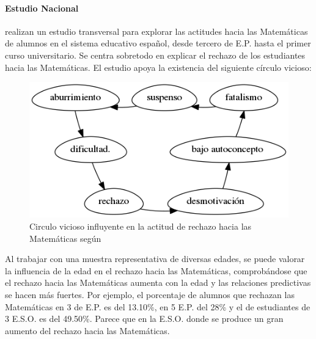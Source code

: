 \paragraph{Estudio Nacional}

\citet*{ActitudesHaciaMates} realizan un estudio transversal para explorar las actitudes hacia las Matemáticas de alumnos en el sistema educativo español, desde tercero de E.P. hasta el primer curso universitario. 
%
Se centra sobretodo en explicar el rechazo de los estudiantes hacia las Matemáticas.
%
El estudio apoya la existencia del siguiente círculo vicioso: 



\begin{figure}[hbt]
\centering
\includegraphics[scale=0.57]{img/circuloVicioso.png}
\caption{Circulo vicioso influyente en la actitud de rechazo hacia las Matemáticas según \citep{ActitudesHaciaMates}}
\label{fig::circuloVicioso}
\end{figure}
\FloatBarrier




Al trabajar con una muestra representativa de diversas edades, se puede valorar la influencia de la edad en el rechazo hacia las Matemáticas, comprobándose que el rechazo hacia las Matemáticas aumenta con la edad y las relaciones predictivas se hacen más fuertes.
%
Por ejemplo, el porcentaje de alumnos que rechazan las Matemáticas en 3 de E.P. es del 13.10\%, en 5 E.P. del 28\%  y el de estudiantes de 3 E.S.O. es del 49.50\%.
%
Parece que en la E.S.O. donde se produce un gran aumento del rechazo hacia las Matemáticas.


